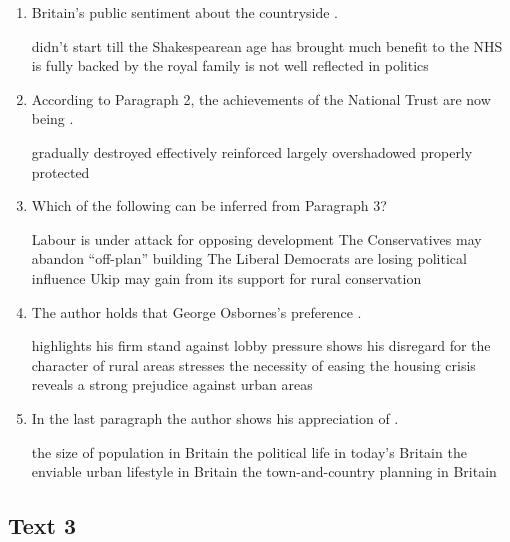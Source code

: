 \begin{enumerate}[resume]
	\item
 Britain's public sentiment about the countryside \lineread.


\fourchoices
{didn't start till the Shakespearean age}
{has brought much benefit to the NHS}
{is fully backed by the royal family}
{is not well reflected in politics}




\item
According to Paragraph 2, the achievements of the National
Trust are now being \lineread.


\fourchoices
{gradually destroyed}
{effectively reinforced}
{largely overshadowed}
{properly protected}



\item
Which of the following can be inferred from Paragraph 3?


\fourchoices
{Labour is under attack for opposing development}
{The Conservatives may abandon ``off-plan'' building}
{The Liberal Democrats are losing political influence}
{Ukip may gain from its support for rural conservation}


\item
The author holds that George Osbornes's preference \lineread.


\fourchoices
{highlights his firm stand against lobby pressure}
{shows his disregard for the character of rural areas}
{stresses the necessity of easing the housing crisis}
{reveals a strong prejudice against urban areas}



\item
 In the last paragraph the author shows his appreciation of \lineread.


\fourchoices
{the size of population in Britain}
{the political life in today's Britain}
{the enviable urban lifestyle in Britain}
{the town-and-country planning in Britain}



\end{enumerate}


\newpage
\subsection{Text 3}


